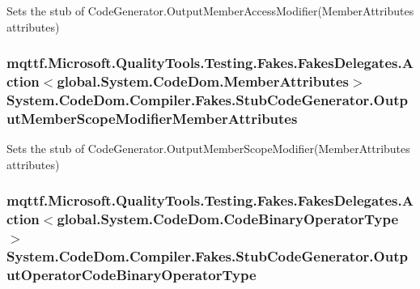 Sets the stub of Code\-Generator.\-Output\-Member\-Access\-Modifier(\-Member\-Attributes attributes)

\hypertarget{class_system_1_1_code_dom_1_1_compiler_1_1_fakes_1_1_stub_code_generator_a7291374c476b7c24fc8216f6660ab3d9}{
\subsubsection[{Output\-Member\-Scope\-Modifier\-Member\-Attributes}]{\setlength{\rightskip}{0pt plus 5cm}mqttf.\-Microsoft.\-Quality\-Tools.\-Testing.\-Fakes.\-Fakes\-Delegates.\-Action$<$global.\-System.\-Code\-Dom.\-Member\-Attributes$>$ System.\-Code\-Dom.\-Compiler.\-Fakes.\-Stub\-Code\-Generator.\-Output\-Member\-Scope\-Modifier\-Member\-Attributes}}\label{class_system_1_1_code_dom_1_1_compiler_1_1_fakes_1_1_stub_code_generator_a7291374c476b7c24fc8216f6660ab3d9}


Sets the stub of Code\-Generator.\-Output\-Member\-Scope\-Modifier(\-Member\-Attributes attributes)

\hypertarget{class_system_1_1_code_dom_1_1_compiler_1_1_fakes_1_1_stub_code_generator_a437ba7d5ecbefd30bda96f9fcb9f55c7}{
\subsubsection[{Output\-Operator\-Code\-Binary\-Operator\-Type}]{\setlength{\rightskip}{0pt plus 5cm}mqttf.\-Microsoft.\-Quality\-Tools.\-Testing.\-Fakes.\-Fakes\-Delegates.\-Action$<$global.\-System.\-Code\-Dom.\-Code\-Binary\-Operator\-Type$>$ System.\-Code\-Dom.\-Compiler.\-Fakes.\-Stub\-Code\-Generator.\-Output\-Operator\-Code\-Binary\-Operator\-Type}}\label{class_system_1_1_code_dom_1_1_compiler_1_1_fakes_1_1_stub_code_generator_a437ba7d5ecbefd30bda96f9fcb9f55c7}


